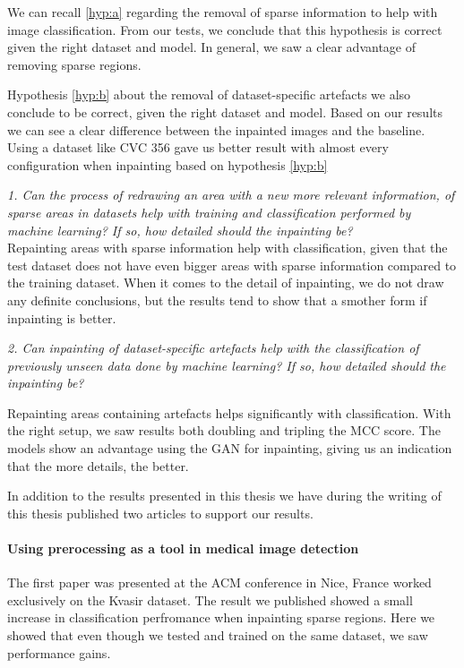 We can recall \ref{hyp:a} regarding the removal of sparse information to help with image classification. From our tests, we conclude that this hypothesis is correct given the right dataset and model. 
In general, we saw a clear advantage of removing sparse regions. 

Hypothesis \ref{hyp:b} about the removal of dataset-specific artefacts we also conclude to be correct, given the right dataset and model. 
Based on our results we can see a clear difference between the inpainted images and the baseline. 
Using a dataset like CVC 356 gave us better result with almost every configuration when inpainting based on hypothesis \ref{hyp:b}

\vspace{5px}
\noindent \textit{1. Can the process of redrawing an area with a new more relevant information, of sparse areas in datasets help with training and classification performed by machine learning? If so, how detailed should the inpainting be?}\\

Repainting areas with sparse information help with classification, given that the test dataset does not have even bigger areas with sparse information compared to the training dataset. When it comes to the detail of inpainting, we do not draw any definite conclusions, but the results tend to show that a smother form if inpainting is better.




\vspace{5px}
\noindent \textit{2. Can inpainting of dataset-specific artefacts help with the classification of previously unseen data done by machine learning? If so, how detailed should the inpainting be?}

Repainting areas containing artefacts helps significantly with classification. With the right setup, we saw results both doubling and tripling the MCC score. The models show an advantage using the GAN for inpainting, giving us an indication that the more details, the better. 


In addition to the results presented in this thesis we have during the writing of this thesis published two articles to support our results.

\paragraph{Using prerocessing as a tool in medical image detection}
The first paper was presented at the ACM conference in Nice, France worked exclusively on the Kvasir dataset. The result we published showed a small increase in classification perfromance when inpainting sparse regions. 
Here we showed that even though we tested and trained on the same dataset, we saw performance gains.

